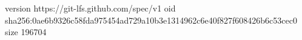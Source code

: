 version https://git-lfs.github.com/spec/v1
oid sha256:0ae6b9326c58fda975454ad729a10b3e1314962c6e40f827f608426b6c53cec0
size 196704
